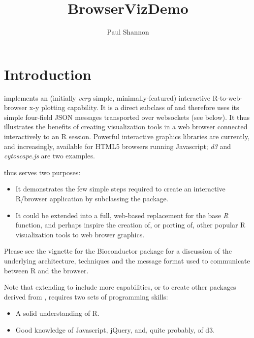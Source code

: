 \documentclass{article}
\title{BrowserVizDemo}
\author{Paul Shannon}
\begin{document}
\maketitle

\tableofcontents

\section{Introduction}

 implements an (initially \emph{very} simple, minimally-featured) interactive R-to-web-browser 
x-y plotting capability.  It is a direct subclass of  and therefore uses its simple four-field
JSON messages transported over websockets (see below).  It thus illustrates the benefits of creating visualization tools
in a web browser connected interactively to an R session.  Powerful interactive graphics libraries are currently, and 
increasingly, available for HTML5 browsers running Javascript; \emph{d3} and \emph{cytoscape.js} are two 
examples.

 thus serves two purposes:

\begin{itemize}
   \item It demonstrates the few simple steps required to create an interactive R/browser application
         by subclassing the  package.

   \item It could be extended into a full,  web-based replacement for the base \emph{R}  function, 
     and perhaps inspire the creation of, or porting of, other popular R visualization tools to web brower graphics.
\end{itemize}


Please see the vignette for the Bioconductor package  for a discussion of the underlying
architecture, techniques and the message format used to communicate between R and the browser.

Note that extending  to include more capabilities, or to create other packages derived
from , requires two sets of programming skills:
\begin{itemize}
   \item A solid understanding of R.
   \item Good knowledge of Javascript, jQuery, and, quite probably, of d3.
\end{itemize}
\end{document}
